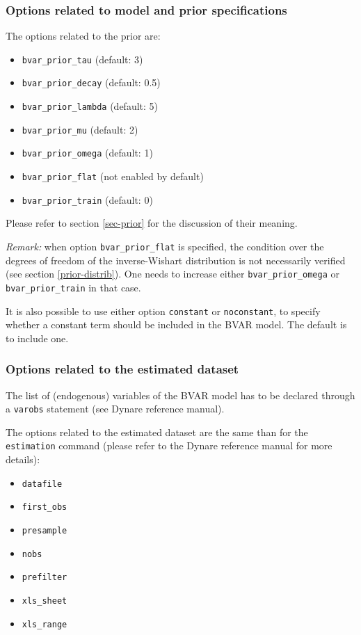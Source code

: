 \documentclass[10pt,a4paper]{article}
\begin{document}
\subsubsection{Options related to model and prior specifications}
\label{sec-model-prior-options}

The options related to the prior are:
\begin{itemize}
\item \texttt{bvar\_prior\_tau} (default: 3)
\item \texttt{bvar\_prior\_decay} (default: 0.5)
\item \texttt{bvar\_prior\_lambda} (default: 5)
\item \texttt{bvar\_prior\_mu} (default: 2)
\item \texttt{bvar\_prior\_omega} (default: 1)
\item \texttt{bvar\_prior\_flat} (not enabled by default)
\item \texttt{bvar\_prior\_train} (default: 0)
\end{itemize}
Please refer to section \ref{sec-prior} for the discussion of their meaning.

\emph{Remark:} when option \texttt{bvar\_prior\_flat} is specified, the condition over the degrees of freedom of the inverse-Wishart distribution is not necessarily verified (see section \ref{prior-distrib}). One needs to increase either \texttt{bvar\_prior\_omega} or \texttt{bvar\_prior\_train} in that case.

It is also possible to use either option \texttt{constant} or \texttt{noconstant}, to specify whether a constant term should be included in the BVAR model. The default is to include one.

\subsubsection{Options related to the estimated dataset}

The list of (endogenous) variables of the BVAR model has to be declared through a \texttt{varobs} statement (see Dynare reference manual).

The options related to the estimated dataset are the same than for the \texttt{estimation} command (please refer to the Dynare reference manual for more details):
\begin{itemize}
\item \texttt{datafile}
\item \texttt{first\_obs}
\item \texttt{presample}
\item \texttt{nobs}
\item \texttt{prefilter}
\item \texttt{xls\_sheet}
\item \texttt{xls\_range}
\end{itemize}
\end{document}
